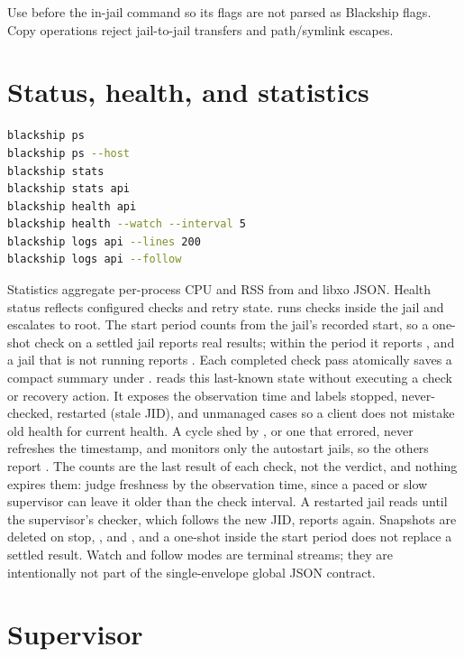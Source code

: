 Use \command{--} before the in-jail command so its flags are not parsed as
Blackship flags. Copy operations reject jail-to-jail transfers and path/symlink
escapes.

\section{Status, health, and statistics}

\begin{lstlisting}[language=bash]
blackship ps
blackship ps --host
blackship stats
blackship stats api
blackship health api
blackship health --watch --interval 5
blackship logs api --lines 200
blackship logs api --follow
\end{lstlisting}

Statistics aggregate per-process CPU and RSS from  and
 libxo JSON. Health status reflects configured checks and retry
state.  runs checks inside the jail and escalates to root.
The start period counts from the jail's recorded start, so a one-shot check on
a settled jail reports real results; within the period it reports
, and a jail that is not running reports .
Each completed check pass atomically saves a compact summary under
.  reads this last-known state without
executing a check or recovery action. It exposes the observation time and
labels stopped, never-checked, restarted (stale JID), and unmanaged cases so a
client does not mistake old health for current health. A cycle shed by
, or one that errored, never refreshes the
timestamp, and  monitors only the autostart jails,
so the others report . The counts are the last result of
each check, not the verdict, and nothing expires them: judge freshness by the
observation time, since a paced or slow supervisor can leave it older than the
check interval. A restarted jail reads  until the
supervisor's checker, which follows the new JID, reports again. Snapshots are
deleted on stop, ,  and , and a one-shot
 inside the start period does not replace a settled result. Watch and follow modes are terminal streams; they are intentionally not
part of the single-envelope global JSON contract.

\section{Supervisor}

